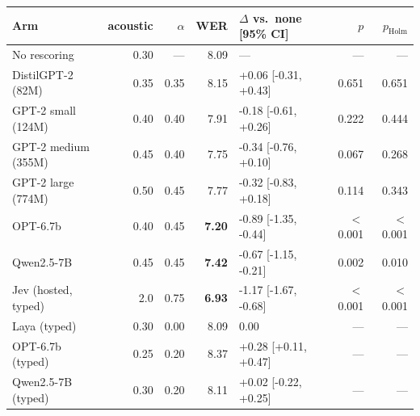 \begin{tabular}{lrrrlrr}
\toprule
Arm & acoustic & $\alpha$ & WER & $\Delta$ vs.\ none [95\% CI] & $p$ & $p_{\text{Holm}}$ \\
\midrule
No rescoring & 0.30 & --- & 8.09 & --- & --- & --- \\
DistilGPT-2 (82M) & 0.35 & 0.35 & 8.15 & +0.06 [-0.31, +0.43] & 0.651 & 0.651 \\
GPT-2 small (124M) & 0.40 & 0.40 & 7.91 & -0.18 [-0.61, +0.26] & 0.222 & 0.444 \\
GPT-2 medium (355M) & 0.45 & 0.40 & 7.75 & -0.34 [-0.76, +0.10] & 0.067 & 0.268 \\
GPT-2 large (774M) & 0.50 & 0.45 & 7.77 & -0.32 [-0.83, +0.18] & 0.114 & 0.343 \\
OPT-6.7b & 0.40 & 0.45 & \textbf{7.20} & -0.89 [-1.35, -0.44] & $<$0.001 & $<$0.001 \\
Qwen2.5-7B & 0.45 & 0.45 & \textbf{7.42} & -0.67 [-1.15, -0.21] & 0.002 & 0.010 \\
Jev (hosted, typed) & 2.0 & 0.75 & \textbf{6.93} & -1.17 [-1.67, -0.68] & $<$0.001 & $<$0.001 \\
\midrule
Laya (typed) & 0.30 & 0.00 & 8.09 & 0.00 & --- & --- \\
OPT-6.7b (typed) & 0.25 & 0.20 & 8.37 & +0.28 [+0.11, +0.47] & --- & --- \\
Qwen2.5-7B (typed) & 0.30 & 0.20 & 8.11 & +0.02 [-0.22, +0.25] & --- & --- \\
\bottomrule
\end{tabular}
